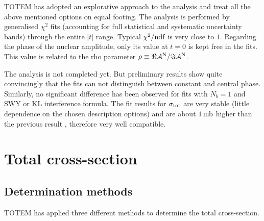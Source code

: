 \documentclass{desyproc}
\def\un#1{\,{\rm #1}}
\begin{document}
TOTEM has adopted an explorative approach to the analysis and treat all the above mentioned options on equal footing. The analysis is performed by generalised $\chi^2$ fits (accounting for full statistical and systematic uncertainty bands) through the entire $|t|$ range. Typical $\chi^2/\hbox{ndf}$ is very close to $1$. Regarding the phase of the nuclear amplitude, only its value at $t = 0$ is kept free in the fits. This value is related to the rho parameter $\rho \equiv \Re {\cal A}^{\rm N} / \Im {\cal A}^{\rm N}$.

The analysis is not completed yet. But preliminary results show quite convincingly that the fits can not distinguish between constant and central phase. Similarly, no significant difference has been observed for fits with $N_b = 1$ and SWY or KL interference formula. The fit results for $\sigma_{\rm tot}$ are very stable (little dependence on the chosen description options) and are about $1\un{mb}$ higher than the previous result \cite{si_tot_8}, therefore very well compatible.



\section{Total cross-section}\label{s:tot}

\subsection{Determination methods}

TOTEM has applied three different methods to determine the total cross-section.
\end{document}
